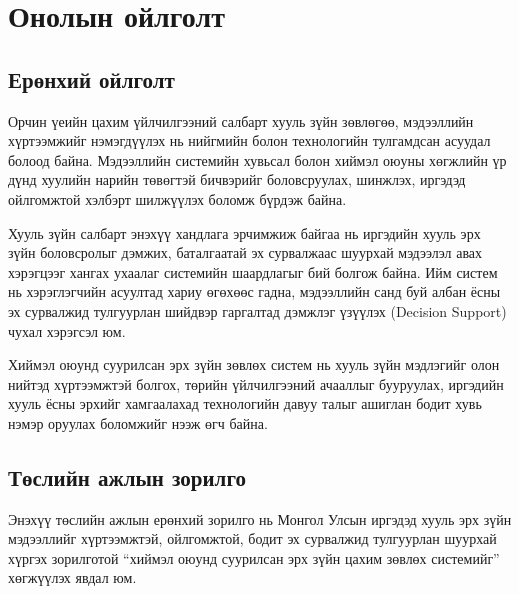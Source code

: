 
\chapter{Онолын ойлголт} %
\label{Chapter1} %


\newcommand{\keyword}[1]{\textbf{#1}}
\newcommand{\tabhead}[1]{\textbf{#1}}
\newcommand{\code}[1]{\texttt{#1}}
\newcommand{\file}[1]{\texttt{\bfseries#1}}
\newcommand{\option}[1]{\texttt{\itshape#1}}


\section{Ерөнхий ойлголт}
Орчин үеийн цахим үйлчилгээний салбарт хууль зүйн зөвлөгөө, мэдээллийн хүртээмжийг нэмэгдүүлэх нь нийгмийн болон технологийн тулгамдсан асуудал болоод байна. Мэдээллийн системийн хувьсал болон хиймэл оюуны хөгжлийн үр дүнд хуулийн нарийн төвөгтэй бичвэрийг боловсруулах, шинжлэх, иргэдэд ойлгомжтой хэлбэрт шилжүүлэх боломж бүрдэж байна.

Хууль зүйн салбарт энэхүү хандлага эрчимжиж байгаа нь иргэдийн хууль эрх зүйн боловсролыг дэмжих, баталгаатай эх сурвалжаас шуурхай мэдээлэл авах хэрэгцээг хангах ухаалаг системийн шаардлагыг бий болгож байна. Ийм систем нь хэрэглэгчийн асуултад хариу өгөхөөс гадна, мэдээллийн санд буй албан ёсны эх сурвалжид тулгуурлан шийдвэр гаргалтад дэмжлэг үзүүлэх (Decision Support) чухал хэрэгсэл юм.

Хиймэл оюунд суурилсан эрх зүйн зөвлөх систем нь хууль зүйн мэдлэгийг олон нийтэд хүртээмжтэй болгох, төрийн үйлчилгээний ачааллыг бууруулах, иргэдийн хууль ёсны эрхийг хамгаалахад технологийн давуу талыг ашиглан бодит хувь нэмэр оруулах боломжийг нээж өгч байна.


\section{Төслийн ажлын зорилго}

Энэхүү төслийн ажлын ерөнхий зорилго нь Монгол Улсын иргэдэд хууль эрх зүйн мэдээллийг хүртээмжтэй, ойлгомжтой, бодит эх сурвалжид тулгуурлан шуурхай хүргэх зорилготой ``хиймэл оюунд суурилсан эрх зүйн цахим зөвлөх системийг'' хөгжүүлэх явдал юм.

